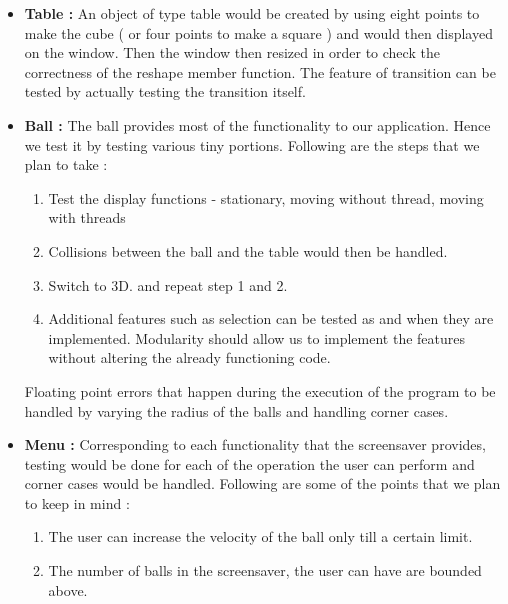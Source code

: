 \documentclass[]{article}
\begin{document}
\begin{itemize}


\item \textbf{Table :}
An object of type table would be created by using eight points to make the cube ( or four points to make a square ) and would then displayed on the window. Then the window then resized in order to check the correctness of the reshape member function. The feature of transition can be tested by actually testing the transition itself.

\item \textbf{Ball :}
The ball provides most of the functionality to our application. Hence we test it by testing various tiny portions. Following are the steps that we plan to take :

\begin{enumerate}

\item { Test the display functions - stationary, moving without thread, moving with threads }

\item { Collisions between the ball and the table would then be handled.}

\item { Switch to 3D. and repeat step 1 and 2.}

\item { Additional features such as selection can be tested as and when they are implemented. Modularity should allow us to implement the features without altering the already functioning code. }
\end{enumerate}
Floating point errors that happen during the execution of the program to be handled by varying the radius of the balls and handling corner cases.\\

\item { \bf Menu : }
Corresponding to each functionality that the screensaver provides, testing would be done for each of the operation the user can perform and corner cases would be handled. Following are some of the points that we plan to keep in mind :

\begin{enumerate}

\item { The user can increase the velocity of the ball only till a certain limit.}

\item { The number of balls in the screensaver, the user can have are bounded above. }


\end{enumerate}
\end{itemize}
\end{document}
